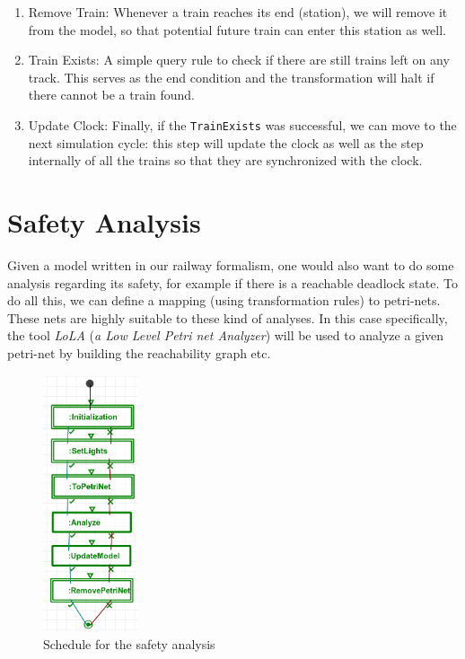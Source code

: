 \documentclass{article}
\begin{document}
\begin{enumerate}
    \item Remove Train: Whenever a train reaches its end (station), we will remove it from the model, so that potential future train can enter this station as well.
    \item Train Exists: A simple query rule to check if there are still trains left on any track. This serves as the end condition and the transformation will halt if there cannot be a train found.
    \item Update Clock: Finally, if the \texttt{TrainExists} was successful, we can move to the next simulation cycle: this step will update the clock as well as the step internally of all the trains so that they are synchronized with the clock.
\end{enumerate}

\section{Safety Analysis}

Given a model written in our railway formalism, one would also want to do some analysis regarding its safety, for example if there is a reachable deadlock state. To do all this, we can define a mapping (using transformation rules) to petri-nets. These nets are highly suitable to these kind of analyses. In this case specifically, the tool \textit{LoLA} (\textit{a Low Level Petri net Analyzer}) \cite{lola} will be used to analyze a given petri-net by building the reachability graph etc.

\begin{figure}[H]
    \centering
    \includegraphics[width=0.25\textwidth]{images/analyze.png}
    \caption{Schedule for the safety analysis}
    \label{schedule_safety}
\end{figure}
\end{document}
